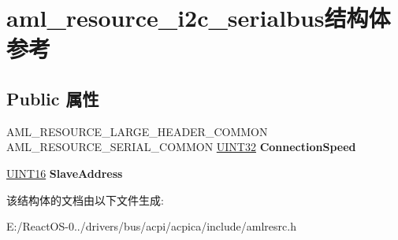 \hypertarget{structaml__resource__i2c__serialbus}{}\section{aml\+\_\+resource\+\_\+i2c\+\_\+serialbus结构体 参考}
\label{structaml__resource__i2c__serialbus}
\subsection*{Public 属性}
\begin{DoxyCompactItemize}
\item 
\mbox{\label{structaml__resource__i2c__serialbus_a7d8ad8d9fda6cb2868aca8e9359e1fdf}} 
A\+M\+L\+\_\+\+R\+E\+S\+O\+U\+R\+C\+E\+\_\+\+L\+A\+R\+G\+E\+\_\+\+H\+E\+A\+D\+E\+R\+\_\+\+C\+O\+M\+M\+ON A\+M\+L\+\_\+\+R\+E\+S\+O\+U\+R\+C\+E\+\_\+\+S\+E\+R\+I\+A\+L\+\_\+\+C\+O\+M\+M\+ON \hyperlink{_processor_bind_8h_ae1e6edbbc26d6fbc71a90190d0266018}{U\+I\+N\+T32} {\bfseries Connection\+Speed}
\item 
\mbox{\label{structaml__resource__i2c__serialbus_a6c634c0b1b4d73bc18b7740ff6e6888f}} 
\hyperlink{_processor_bind_8h_a09f1a1fb2293e33483cc8d44aefb1eb1}{U\+I\+N\+T16} {\bfseries Slave\+Address}
\end{DoxyCompactItemize}


该结构体的文档由以下文件生成\+:\begin{DoxyCompactItemize}
\item 
E\+:/\+React\+O\+S-\/0../drivers/bus/acpi/acpica/include/amlresrc.\+h\end{DoxyCompactItemize}
